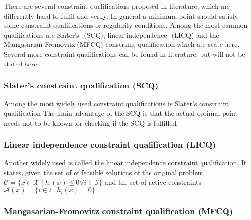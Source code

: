     There are several constraint qualifications proposed in literature, which are differently hard to fulfil
    and verify. In general a minimum point should satisfy some constraint qualifications or regularity conditions.
    Among the most common qualifications are Slater's- (SCQ), linear independence- (LICQ) and the Mangasarian-Fromovitz (MFCQ)
    constraint qualification which are state here. Several more constraint qualifications can be found in literature, 
    but will not be stated here.

    \subsubsection{Slater's constraint qualification (SCQ)}
    Among the most widely used constraint qualifications is Slater's constraint qualification
    The main advantage of the SCQ is that the actual optimal point needs not to be known for checking
    if the SCQ is fulfilled.

    \subsubsection{Linear independence constraint qualification (LICQ)}
    Another widely used is called the linear independence constraint qualification. It states,
    given the set of of feasible solutions of the original problem $\mathcal{C} = \{x \in \mathcal{X} \; | \; h_i(x) \leq 0
    \forall i \in \mathcal{I} \}$ and the set of active constraints $\mathcal{A}(\bar{x}) = \{i \in \mathcal{i} \; | \; h_i(\bar{x}) = 0 \}$

    \subsubsection{Mangasarian-Fromovitz constraint qualification (MFCQ)}



